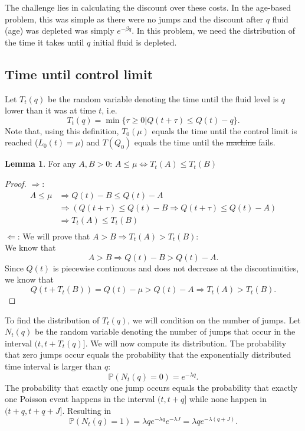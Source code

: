 \documentclass[a4paper]{thesis}
\theoremstyle{definition}
\newtheorem{lemma}{Lemma}[chapter]  %
\providecommand{\DIFaddtex}[1]{{\protect\color{blue}\uwave{#1}}} %
\providecommand{\DIFdeltex}[1]{{\protect\color{red}\sout{#1}}}                      %
\providecommand{\DIFaddbegin}{} %
\providecommand{\DIFaddend}{} %
\providecommand{\DIFdelbegin}{} %
\providecommand{\DIFdelend}{} %
\providecommand{\DIFadd}[1]{\texorpdfstring{\DIFaddtex{#1}}{#1}} %
\providecommand{\DIFdel}[1]{\texorpdfstring{\DIFdeltex{#1}}{}} %
\newcommand{\DIFscaledelfig}{0.5}
\newlength{\DIFdelgraphicswidth} %
\newlength{\DIFdelgraphicsheight} %
\newcommand{\DIFaddincludegraphics}[2][]{{\color{blue}\fbox{\DIFOincludegraphics[#1]{#2}}}} %
\newcommand{\DIFdelincludegraphics}[2][]{%
	\sbox{\DIFdelgraphicsbox}{\DIFOincludegraphics[#1]{#2}}%
	\settoboxwidth{\DIFdelgraphicswidth}{\DIFdelgraphicsbox} %
	\settoboxtotalheight{\DIFdelgraphicsheight}{\DIFdelgraphicsbox} %
	\scalebox{\DIFscaledelfig}{%
		\parbox[b]{\DIFdelgraphicswidth}{\usebox{\DIFdelgraphicsbox}\\[-\baselineskip] \rule{\DIFdelgraphicswidth}{0em}}\llap{\resizebox{\DIFdelgraphicswidth}{\DIFdelgraphicsheight}{%
				\setlength{\unitlength}{\DIFdelgraphicswidth}%
				\begin{picture}(1,1)%
				\thicklines\linethickness{2pt} %
				{\color[rgb]{1,0,0}\put(0,0){\framebox(1,1){}}}%
				{\color[rgb]{1,0,0}\put(0,0){\line( 1,1){1}}}%
				{\color[rgb]{1,0,0}\put(0,1){\line(1,-1){1}}}%
				\end{picture}%
			}\hspace*{3pt}}} %
} %
\DeclareRobustCommand{\DIFaddbegin}{\DIFOaddbegin \let\includegraphics\DIFaddincludegraphics} %
\DeclareRobustCommand{\DIFaddend}{\DIFOaddend \let\includegraphics\DIFOincludegraphics} %
\DeclareRobustCommand{\DIFdelbegin}{\DIFOdelbegin \let\includegraphics\DIFdelincludegraphics} %
\DeclareRobustCommand{\DIFdelend}{\DIFOaddend \let\includegraphics\DIFOincludegraphics} %
\begin{document}
	The challenge lies in calculating the discount over these costs.
	In the age-based problem, this was simple as there were no jumps and the discount after $q$ fluid (age) was depleted was simply $e^{-\beta q}$.
	In this problem, we need the distribution of the time it takes until $q$ initial fluid is depleted.
	
	\subsection{Time until control limit}
	Let $T_t(q)$ be the random variable denoting the time until the fluid level is $q$ lower than it was at time $t$, i.e.
	$$
	T_t(q)=\min\{\tau\geq0|Q(t+\tau)\leq Q(t)-q\}.
	$$
	Note that, using this definition, $T_0(\mu)$ equals the time until the control limit is reached ($L_0(t)=\mu$) and \DIFdelbegin \DIFdel{$T(Q_0)$ }\DIFdelend \DIFaddbegin \DIFadd{$T_0(Q_0)$ }\DIFaddend equals the time until the \DIFdelbegin \DIFdel{machine }\DIFdelend \DIFaddbegin \DIFadd{asset }\DIFaddend fails.
	\begin{lemma}\label{lemma:TimeUntilFluidLemma}
		For any $A,B>0$:
		$A\leq\mu\Leftrightarrow T_t(A)\leq T_t(B)$
		\begin{proof}
			$\Rightarrow$: 
			\[\begin{split}
			A\leq\mu&\Rightarrow Q(t)-B\leq Q(t)-A\\
			&\Rightarrow (Q(t+\tau)\leq Q(t)-B\Rightarrow Q(t+\tau)\leq Q(t)-A)\\
			&\Rightarrow T_t(A)\leq T_t(B)\\
			\end{split}\]
			$\Leftarrow$: We will prove that $A>B\Rightarrow T_t(A)> T_t(B)$:\\
			We know that
			$$
			A>B\Rightarrow Q(t)-B > Q(t)-A.
			$$
			Since $Q(t)$ is piecewise continuous and does not decrease at the discontinuities, we know that 
			$$
			Q(t+T_t(B))=Q(t)-\mu>Q(t)-A\Rightarrow T_t(A)> T_t(B).
			$$
		\end{proof}
	\end{lemma}
	To find the distribution of $T_t(q)$, we will condition on the number of jumps.
	Let $N_t(q)$ be the random variable denoting the number of jumps that occur in the interval $(t,t+T_t(q)]$.
	We will now compute its distribution.
	The probability that zero jumps occur equals the probability that the exponentially distributed time interval is larger than $q$:
	$$
	\mathbb{P}(N_t(q)=0)=e^{-\lambda q}.
	$$
	The probability that exactly one jump occurs equals the probability that exactly one Poisson event happens in the interval $(t,t+q]$ while none happen in $(t+q,t+q+J]$. Resulting in
	$$
	\mathbb{P}(N_t(q)=1)=\lambda q e^{-\lambda q} e^{-\lambda J}=\lambda q e^{-\lambda (q+J)}.
	$$
	
\end{document}
